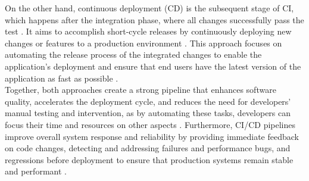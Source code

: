 On the other hand, continuous deployment (\ac{CD}) is the subsequent stage of \ac{CI}, which happens after the integration phase, where all changes successfully pass the test \cite{rangnau2020continuoussecuritytesting}. It aims to accomplish short-cycle releases by continuously deploying new changes or features to a production environment \cite{rangnau2020continuoussecuritytesting, zampetti2021cicdpipelinesevulution}. This approach focuses on automating the release process of the integrated changes to enable the application's deployment and ensure that end users have the latest version of the application as fast as possible \cite{goyal2024optimisingcloudbasedcicd}. \\
Together, both approaches create a strong pipeline that enhances software quality, accelerates the deployment cycle, and reduces the need for developers' manual testing and intervention, as by automating these tasks, developers can focus their time and resources on other aspects \cite{joshi2022implementingAutomatedTesting, zampetti2021cicdpipelinesevulution}. Furthermore, \ac{CI}/\ac{CD} pipelines improve overall system response and reliability by providing immediate feedback on code changes, detecting and addressing failures and performance bugs, and regressions before deployment to ensure that production systems remain stable and performant \cite{goyal2024optimisingcloudbasedcicd, dimitrov2000impact, joshi2022implementingAutomatedTesting}.

